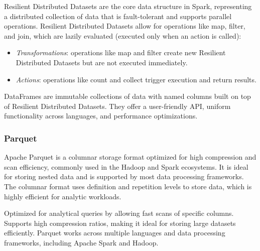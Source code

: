 Resilient Distributed
Datasets are the core data structure in Spark, representing a distributed collection of data that is fault-tolerant and supports parallel operations. 
Resilient Distributed
Datasets allow for operations like map, filter, and join, which are lazily evaluated (executed only when an action is called): 
\begin{itemize}
    \item \textit{Transformations}: operations like map and filter create new Resilient Distributed
Datasets but are not executed immediately.
    \item \textit{Actions}: operations like count and collect trigger execution and return results.
\end{itemize}
DataFrames are immutable collections of data with named columns built on top of Resilient Distributed
Datasets. 
They offer a user-friendly API, uniform functionality across languages, and performance optimizations.

\subsubsection{Parquet}
Apache Parquet is a columnar storage format optimized for high compression and scan efficiency, commonly used in the Hadoop and Spark ecosystems. 
It is ideal for storing nested data and is supported by most data processing frameworks. The columnar format uses definition and repetition levels to store data, which is highly efficient for analytic workloads.

Optimized for analytical queries by allowing fast scans of specific columns.
Supports high compression ratios, making it ideal for storing large datasets efficiently.
Parquet works across multiple languages and data processing frameworks, including Apache Spark and Hadoop.